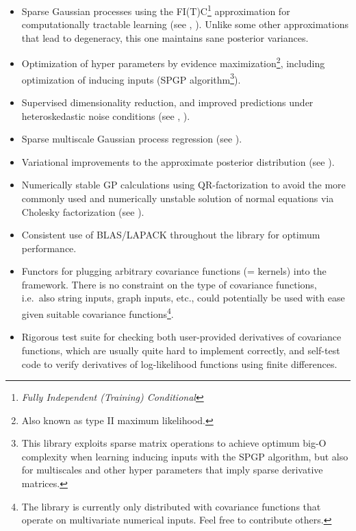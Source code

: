 \documentclass[10pt]{article}
\begin{document}
\begin{itemize}

\item Sparse Gaussian processes using the FI(T)C\footnote{\emph{Fully
Independent (Training) Conditional}} approximation for computationally
tractable learning (see \cite{conf/nips/2005}, \cite{SnelsonThesis}).
Unlike some other approximations that lead to degeneracy, this one
maintains sane posterior variances.

\item Optimization of hyper parameters by evidence
maximization\footnote{Also known as type II maximum likelihood.},
including optimization of inducing inputs (SPGP algorithm\footnote{This
library exploits sparse matrix operations to achieve optimum big-O
complexity when learning inducing inputs with the SPGP algorithm,
but also for multiscales and other hyper parameters that imply
sparse derivative matrices.}).

\item Supervised dimensionality reduction, and improved predictions
under heteroskedastic noise conditions (see \cite{conf/uai/SnelsonG06},
\cite{SnelsonThesis}).

\item Sparse multiscale Gaussian process regression (see
\cite{conf/icml/WalderKS08}).

\item Variational improvements to the approximate posterior
distribution (see \cite{Titsias2009}).

\item Numerically stable GP calculations using QR-factorization to
avoid the more commonly used and numerically unstable solution of
normal equations via Cholesky factorization (see \cite{Foster2009}).

\item Consistent use of BLAS/LAPACK throughout the library for
optimum performance.

\item Functors for plugging arbitrary covariance functions (=
kernels) into the framework.  There is no constraint on the type
of covariance functions, i.e.\ also string inputs, graph inputs,
etc., could potentially be used with ease given suitable covariance
functions\footnote{The library is currently only distributed with
covariance functions that operate on multivariate numerical inputs.
Feel free to contribute others.}.

\item Rigorous test suite for checking both user-provided derivatives
of covariance functions, which are usually quite hard to implement
correctly, and self-test code to verify derivatives of log-likelihood
functions using finite differences.

\end{itemize}
\end{document}

